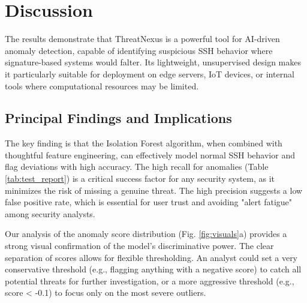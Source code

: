 \documentclass[conference]{IEEEtran}
\begin{document}
\section{Discussion}
The results demonstrate that ThreatNexus is a powerful tool for AI-driven anomaly detection, capable of identifying suspicious SSH behavior where signature-based systems would falter. Its lightweight, unsupervised design makes it particularly suitable for deployment on edge servers, IoT devices, or internal tools where computational resources may be limited.

\subsection{Principal Findings and Implications}
The key finding is that the Isolation Forest algorithm, when combined with thoughtful feature engineering, can effectively model normal SSH behavior and flag deviations with high accuracy. The high recall for anomalies (Table \ref{tab:test_report}) is a critical success factor for any security system, as it minimizes the risk of missing a genuine threat. The high precision suggests a low false positive rate, which is essential for user trust and avoiding "alert fatigue" among security analysts.

Our analysis of the anomaly score distribution (Fig. \ref{fig:visuals}a) provides a strong visual confirmation of the model's discriminative power. The clear separation of scores allows for flexible thresholding. An analyst could set a very conservative threshold (e.g., flagging anything with a negative score) to catch all potential threats for further investigation, or a more aggressive threshold (e.g., score < -0.1) to focus only on the most severe outliers.
\end{document}
